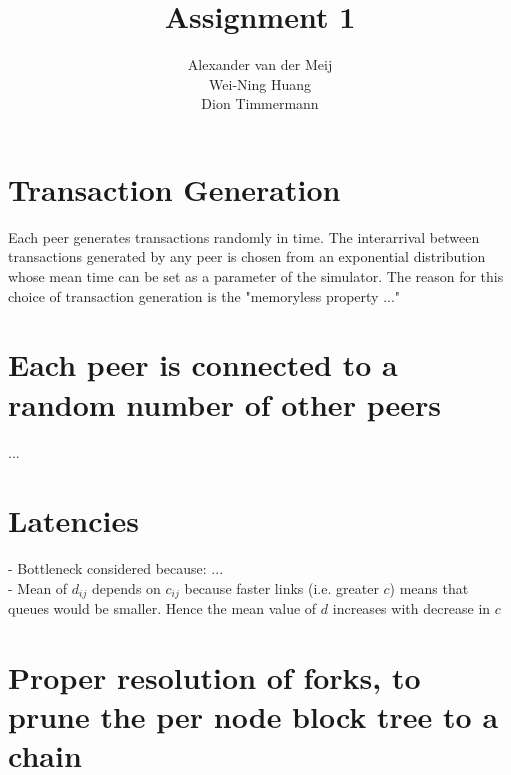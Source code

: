 \documentclass[11pt]{article}
\title{\textbf{Assignment 1}}
\author{Alexander van der Meij\\
		Wei-Ning Huang\\
		Dion Timmermann}
\date{}
\begin{document}
\maketitle

\section{Transaction Generation}
Each peer generates transactions randomly in time. The interarrival between transactions generated by any peer is chosen from an exponential distribution whose mean time can be set as a parameter of the simulator.
The reason for this choice of transaction generation is the "memoryless property ..."

\section{Each peer is connected to a random number of other peers}
...

\section{Latencies}
- Bottleneck considered because:  ...\\
- Mean of $d_{ij}$ depends on $c_{ij}$ because faster links (i.e. greater $c$) means that queues would be smaller. Hence the mean value of $d$ increases with decrease in $c$


\section{Proper resolution of forks, to prune the per node block tree to a chain}
\end{document}
